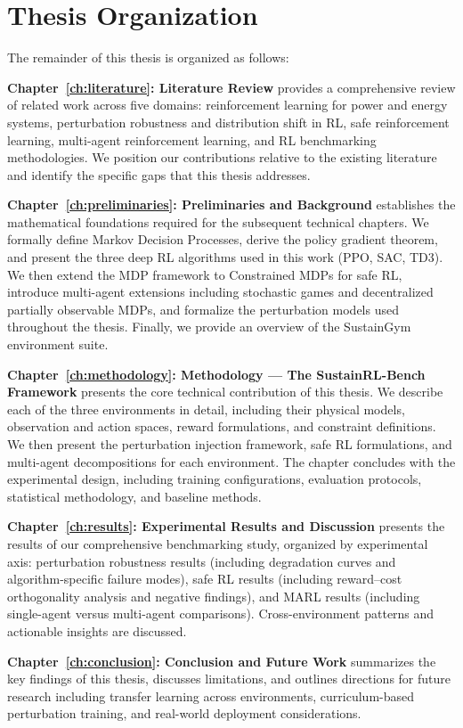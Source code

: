 \section{Thesis Organization}
\label{sec:organization}

The remainder of this thesis is organized as follows:

\textbf{Chapter~\ref{ch:literature}: Literature Review} provides a comprehensive review of related work across five domains: reinforcement learning for power and energy systems, perturbation robustness and distribution shift in RL, safe reinforcement learning, multi-agent reinforcement learning, and RL benchmarking methodologies. We position our contributions relative to the existing literature and identify the specific gaps that this thesis addresses.

\textbf{Chapter~\ref{ch:preliminaries}: Preliminaries and Background} establishes the mathematical foundations required for the subsequent technical chapters. We formally define Markov Decision Processes, derive the policy gradient theorem, and present the three deep RL algorithms used in this work (PPO, SAC, TD3). We then extend the MDP framework to Constrained MDPs for safe RL, introduce multi-agent extensions including stochastic games and decentralized partially observable MDPs, and formalize the perturbation models used throughout the thesis. Finally, we provide an overview of the SustainGym environment suite.

\textbf{Chapter~\ref{ch:methodology}: Methodology --- The SustainRL-Bench Framework} presents the core technical contribution of this thesis. We describe each of the three environments in detail, including their physical models, observation and action spaces, reward formulations, and constraint definitions. We then present the perturbation injection framework, safe RL formulations, and multi-agent decompositions for each environment. The chapter concludes with the experimental design, including training configurations, evaluation protocols, statistical methodology, and baseline methods.

\textbf{Chapter~\ref{ch:results}: Experimental Results and Discussion} presents the results of our comprehensive benchmarking study, organized by experimental axis: perturbation robustness results (including degradation curves and algorithm-specific failure modes), safe RL results (including reward--cost orthogonality analysis and negative findings), and MARL results (including single-agent versus multi-agent comparisons). Cross-environment patterns and actionable insights are discussed.

\textbf{Chapter~\ref{ch:conclusion}: Conclusion and Future Work} summarizes the key findings of this thesis, discusses limitations, and outlines directions for future research including transfer learning across environments, curriculum-based perturbation training, and real-world deployment considerations.
